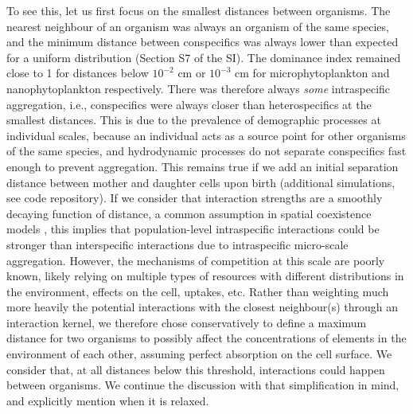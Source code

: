 \documentclass[12pt,english]{article}
\begin{document}
To see this, let us first focus on the smallest distances between
organisms. The nearest neighbour of an organism was always an organism
of the same species, and the minimum distance between conspecifics
was always lower than expected for a uniform distribution (Section
S7 of the SI). The dominance index remained close to 1 for distances
below $10^{-2}$ cm or $10^{-3}$ cm for microphytoplankton and nanophytoplankton
respectively. There was therefore always \emph{some} intraspecific
aggregation, i.e., conspecifics were always closer than heterospecifics
at the smallest distances. This is due to the prevalence of demographic
processes at individual scales, because an individual acts as a source
point for other organisms of the same species, and hydrodynamic processes
do not separate conspecifics fast enough to prevent aggregation. This remains true if we add an initial separation distance between mother and daughter cells upon birth (additional simulations, see code repository). If we consider that interaction strengths are a smoothly decaying function
of distance, a common assumption in spatial coexistence models \citep[e.g., ][]{bolker_spatial_1999,law_population_2003},
this implies that population-level intraspecific interactions could
be stronger than interspecific interactions due to intraspecific micro-scale
aggregation. However, the mechanisms of competition at this scale
are poorly known, likely relying on multiple types of resources with
different distributions in the environment, effects on the cell, uptakes,
etc. Rather than weighting much more heavily the potential interactions
with the closest neighbour(s) through an interaction kernel, we therefore
chose conservatively to define a maximum distance for two organisms
to possibly affect the concentrations of elements in the environment
of each other, assuming perfect absorption on the cell surface. We consider that, at all distances below this threshold, interactions could happen between organisms. We continue the discussion with that simplification in mind, and explicitly mention when it is relaxed.
\end{document}
